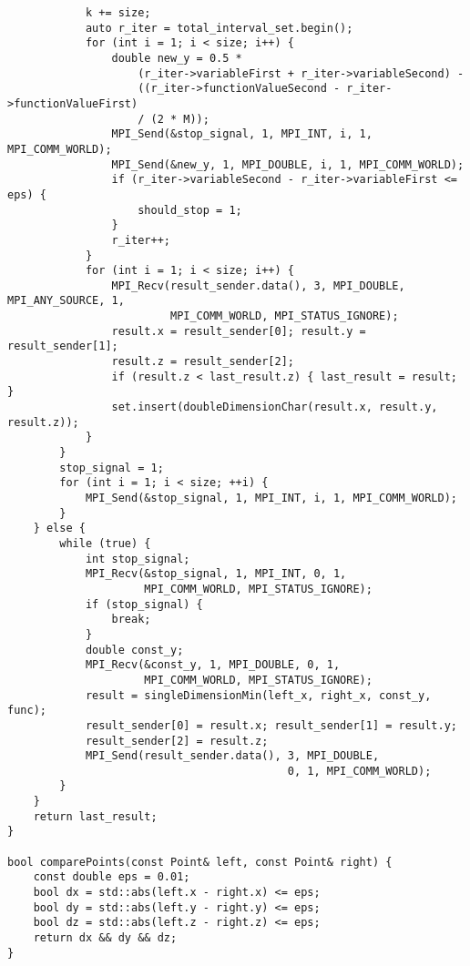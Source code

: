 \documentclass{report}
\begin{document}
\begin{lstlisting}
            k += size;
            auto r_iter = total_interval_set.begin();
            for (int i = 1; i < size; i++) {
                double new_y = 0.5 *
                    (r_iter->variableFirst + r_iter->variableSecond) -
                    ((r_iter->functionValueSecond - r_iter->functionValueFirst)
                    / (2 * M));
                MPI_Send(&stop_signal, 1, MPI_INT, i, 1, MPI_COMM_WORLD);
                MPI_Send(&new_y, 1, MPI_DOUBLE, i, 1, MPI_COMM_WORLD);
                if (r_iter->variableSecond - r_iter->variableFirst <= eps) {
                    should_stop = 1;
                }
                r_iter++;
            }
            for (int i = 1; i < size; i++) {
                MPI_Recv(result_sender.data(), 3, MPI_DOUBLE, MPI_ANY_SOURCE, 1,
                         MPI_COMM_WORLD, MPI_STATUS_IGNORE);
                result.x = result_sender[0]; result.y = result_sender[1];
                result.z = result_sender[2];
                if (result.z < last_result.z) { last_result = result; }
                set.insert(doubleDimensionChar(result.x, result.y, result.z));
            }
        }
        stop_signal = 1;
        for (int i = 1; i < size; ++i) {
            MPI_Send(&stop_signal, 1, MPI_INT, i, 1, MPI_COMM_WORLD);
        }
    } else {
        while (true) {
            int stop_signal;
            MPI_Recv(&stop_signal, 1, MPI_INT, 0, 1,
                     MPI_COMM_WORLD, MPI_STATUS_IGNORE);
            if (stop_signal) {
                break;
            }
            double const_y;
            MPI_Recv(&const_y, 1, MPI_DOUBLE, 0, 1,
                     MPI_COMM_WORLD, MPI_STATUS_IGNORE);
            result = singleDimensionMin(left_x, right_x, const_y, func);
            result_sender[0] = result.x; result_sender[1] = result.y;
            result_sender[2] = result.z;
            MPI_Send(result_sender.data(), 3, MPI_DOUBLE,
                                           0, 1, MPI_COMM_WORLD);
        }
    }
    return last_result;
}

bool comparePoints(const Point& left, const Point& right) {
    const double eps = 0.01;
    bool dx = std::abs(left.x - right.x) <= eps;
    bool dy = std::abs(left.y - right.y) <= eps;
    bool dz = std::abs(left.z - right.z) <= eps;
    return dx && dy && dz;
}
\end{lstlisting}
\end{document}
